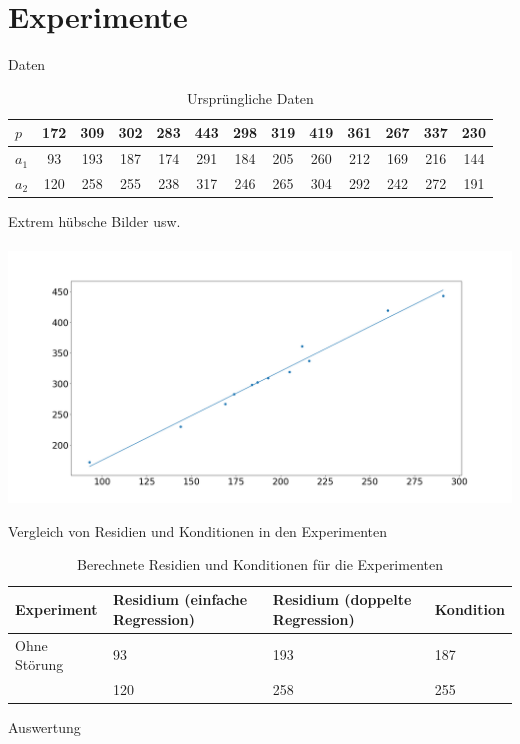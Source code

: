 \documentclass{beamer}
\begin{document}
\section{Experimente}

\begin{frame}{Daten}
	\begin{table}\small
		\begin{tabular}{l || c c c c c c c c c c c c}
			$p$ & 172&309&302&283&443&298&319&419&361&267&337&230\\
			\hline
			$a_1$ & 93&193&187&174&291&184&205&260&212&169&216&144\\
			\hline
			$a_2$ & 120&258&255&238&317&246&265&304&292&242&272&191\\
		\end{tabular}
		\caption{Ursprüngliche Daten}
	\end{table}
\end{frame}

\begin{frame}
Extrem hübsche Bilder usw.\\~\\
\includegraphics[width=\textwidth]{Beispielbild}
\end{frame}

\begin{frame}{Vergleich von Residien und Konditionen in den Experimenten}\small
	\begin{table}
		\begin{tabular}{p{2cm}|p{3.5cm}|p{3.5cm}|p{1.5cm}}
			Experiment & Residium (einfache Regression)&Residium (doppelte Regression)&Kondition\\
			\hline
			Ohne Störung & 93&193&187\\
			\hline
			 & 120&258&255\\
			 \hline
		\end{tabular}
		\caption{Berechnete Residien und Konditionen für die Experimenten}
	\end{table}
\end{frame}

\begin{frame}{Auswertung}
	
\end{frame}
\end{document}

